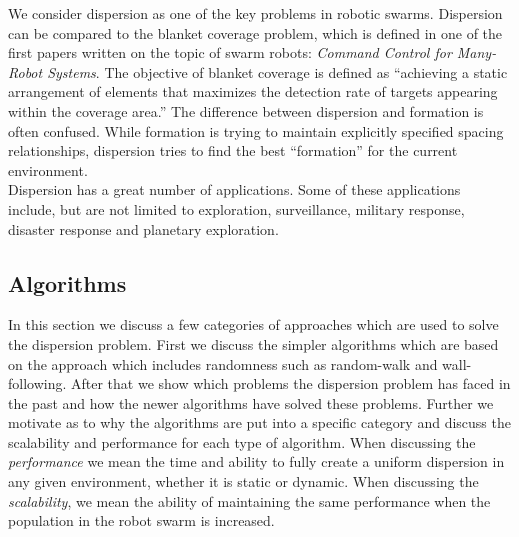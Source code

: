 
We consider dispersion as one of the key problems in robotic swarms. \cite{ugur2007dispersion,mclurkin2007distributed,ludwig2006robotic} 
Dispersion can be compared to the blanket coverage problem, which is defined in one of the first papers written on the topic of swarm robots: \emph{Command Control for Many-Robot Systems}. \cite{gage1992command} 
The objective of blanket coverage is defined as ``achieving a static arrangement of elements that maximizes the detection rate of targets appearing within the coverage area.'' \cite{gage1992command} 
The difference between dispersion and formation is often confused. 
While formation is trying to maintain explicitly specified spacing relationships, dispersion tries to find the best ``formation'' for the current environment. \\
Dispersion has a great number of applications. 
Some of these applications include, but are not limited to exploration, surveillance, military response, disaster response and planetary exploration. \cite{ludwig2006robotic,Penders2011,mclurkin2007distributed} 

\subsection{Algorithms}
In this section we discuss a few categories of approaches which are used to solve the dispersion problem.
First we discuss the simpler algorithms which are based on the approach which includes randomness such as random-walk and wall-following.
After that we show which problems the dispersion problem has faced in the past and how the newer algorithms have solved these problems.
Further we motivate as to why the algorithms are put into a specific category and discuss the scalability and performance for each type of algorithm.
When discussing the \emph{performance} we mean the time and ability to fully create a uniform dispersion in any given environment, whether it is static or dynamic. When discussing the \emph{scalability}, we mean the ability of maintaining the same performance when the population in the robot swarm is increased.

